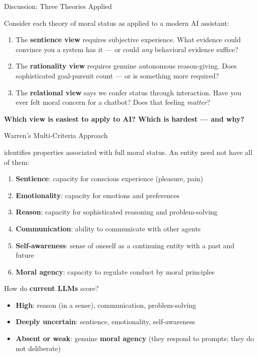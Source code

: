 \documentclass[aspectratio=169,11pt]{beamer}
\begin{document}
\begin{frame}{Discussion: Three Theories Applied}
\begin{discussionbox}[Discussion]
\small
Consider each theory of moral status as applied to a modern AI assistant:
\begin{enumerate}
    \item The \textbf{sentience view} requires subjective experience. What evidence could convince you a system has it --- or could \emph{any} behavioral evidence suffice?
    \item The \textbf{rationality view} requires genuine autonomous reason-giving. Does sophisticated goal-pursuit count --- or is something more required?
    \item The \textbf{relational view} says we confer status through interaction. Have you ever felt moral concern for a chatbot? Does that feeling \emph{matter}?
\end{enumerate}
\textbf{Which view is easiest to apply to AI? Which is hardest --- and why?}
\end{discussionbox}
\end{frame}

\begin{frame}[shrink=5]{Warren's Multi-Criteria Approach}
\begin{conceptbox}
\small
\textcite{warren_moral_status} identifies properties associated with full moral status. An entity need not have all of them:

\vspace{0.1cm}
\begin{enumerate}
    \item \textbf{Sentience}: capacity for conscious experience (pleasure, pain)
    \item \textbf{Emotionality}: capacity for emotions and preferences
    \item \textbf{Reason}: capacity for sophisticated reasoning and problem-solving
    \item \textbf{Communication}: ability to communicate with other agents
    \item \textbf{Self-awareness}: sense of oneself as a continuing entity with a past and future
    \item \textbf{Moral agency}: capacity to regulate conduct by moral principles
\end{enumerate}
\end{conceptbox}

\vspace{0.1cm}
How do \textbf{current LLMs} score?
\begin{itemize}
    \item \textbf{High}: reason (in a sense), communication, problem-solving
    \item \textbf{Deeply uncertain}: sentience, emotionality, self-awareness
    \item \textbf{Absent or weak}: genuine \textbf{moral agency} (they respond to prompts; they do not deliberate)
\end{itemize}
\end{frame}
\end{document}
